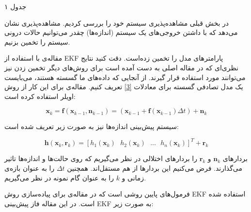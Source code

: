 \documentclass[11pt, fleqn]{article}
\begin{document}
\begin{multicols}{2}
\begin{center}
جدول ۱
\end{center}






















در بخش قبلی مشاهده‌پذیری سیستم خود را بررسی کردیم. مشاهده‌پذیری نشان‌ می‌دهد که با داشتن خروجی‌های یک سیستم (اندازه‌ها) چقدر می‌توانیم حالات درونی سیستم را تخمین بزنیم.

مقاله‌ی 
\cite{main}
 با استفاده از EKF پارامترهای مدل را تخمین زده‌است. دقت کنید نتایج نظری‌ای که در مقاله اصلی به دست آمده است برای روش‌های دیگر تخمین زدن نیز می‌توانند مورد استفاده قرار گیرند. 
	از آنجایی که داده‌های ما گسسته هستند، می‌بایست یک مدل تصادفی گسسته برای معادلات
\ref{3}
	 تعریف کنیم. مقاله‌ی 
\cite{main}
	  برای این کار از روش اویلر استفاده کرده است:

\useshortskip
\begin{LTR}
\begin{equation}
\label{17}
\mathbf{x}_k = \mathbf{f}({\mathbf{x}_{k-1}},\mathbf{n}_{k-1}) = (\mathbf{x}_{k-1}+ \mathbf{f}(\mathbf{x}_{k-1})\Delta t)+\mathbf{n}_k
\end{equation}
\end{LTR}

	سیستم پیش‌بینی اندازه‌ها نیز به صورت زیر تعریف شده است:
	
\useshortskip
\begin{LTR}
\begin{equation}
\label{18}
\mathbf{h}(\mathbf{x}_k,\mathbf{r}_k) = [h_{1}(\mathbf{x}_k) \ \ \  h_{2}(\mathbf{x}_k)  \ \ \  ...  \ \ \  h_{n}(\mathbf{x}_k)]^{T} + \mathbf{r}_k
\end{equation}
\end{LTR}

بردارهای
$\mathbf{n}_k$
	 و 
$\mathbf{r}_k$
	 را بردار‌های اختلالی
در نظر می‌گیریم که روی حالت‌ها و اندازه‌ها تاثیر می‌گذارند. فرض می‌کنیم این بردارها از هم مستقل‌اند. 
همچنین 
$\Delta t$
	  را به عنوان بازه‌ی زمانی و
$k$
	را به عنوان گام نمونه در نظر می‌گیریم.
	 
فرمول‌های پایین روشی است که در مقاله‌ی
\cite{main}
 برای پیاده‌سازی روش 
EKF
استفاده شده است. در این مقاله فاز پیش‌بینی EKF به صورت زیر:


\end{multicols}
\end{document}
